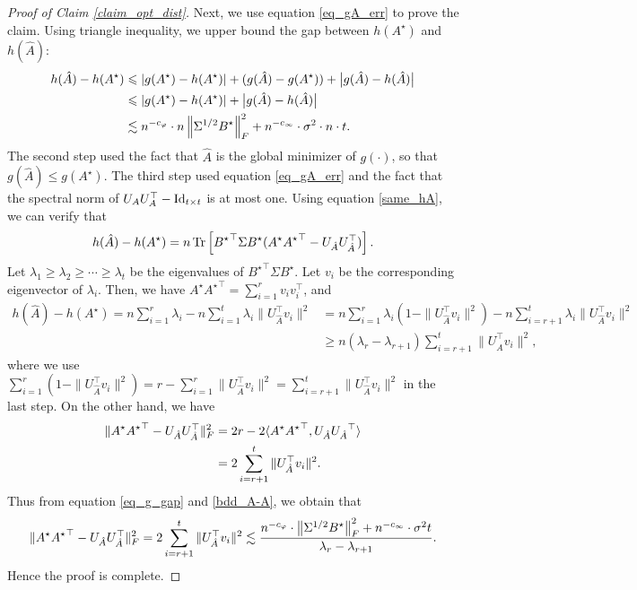 \begin{proof}[Proof of Claim \ref{claim_opt_dist}]
	\medskip
	Next, we use equation \eqref{eq_gA_err} to prove the claim.
	Using triangle inequality, we upper bound the gap between $h(A^{\star})$ and $h(\hat{A})$:  
	\begin{align}
		h(\hat{A})- h(A^{\star})   &\leqslant {\left| {g(A^{\star}) - h(A^{\star})} \right|} + (g(\hat A) - g({A}^{\star})) + \big|g(\hat{A}) - h(\hat{A})\big| \nonumber \\
		&\leqslant {\left| {g(A^{\star}) - h(A^{\star})} \right|}  + \big|g(\hat{A}) - h(\hat{A})\big|\nonumber \\
		&\lesssim n^{-c_\varphi}\cdot n \left\| \Sigma^{1/2} B^{\star} \right\|_{F}^2 + n^{-c_\infty}\cdot \sigma^2 \cdot n \cdot t. \label{eq_g_gap}
	\end{align}
	The second step used the fact that $\hat A$ is the global minimizer of $g(\cdot)$, so that $g(\hat A) \le g({A}^\star)$.
	The third step used equation \eqref{eq_gA_err} and the fact that the spectral norm of $U_A U_A^{\top} - \operatorname{Id}_{t\times t}$ is at most one. 
	Using equation \eqref{same_hA}, we can verify that
	$$h(\hat A)-h(A^\star) = n \operatorname{Tr}\left[{B^\star}^\top\Sigma B^\star ( A^\star {A^\star}^\top -U_{\hat A}U^\top_{\hat A})\right] .$$
	Let $\lambda_1\ge\lambda_2 \ge \cdots\ge \lambda_t$ be the eigenvalues of ${B^\star}^\top\Sigma B^\star$.
	Let $v_i$ be the corresponding eigenvector of $\lambda_i$.
	Then, we have $A^\star {A^\star}^\top =\sum_{i=1}^r v_i v_i^\top$, and
	\begin{align}
	h(\hat A)-h(A^\star) = n \sum_{i=1}^r \lambda_i - n\sum_{i=1}^t \lambda_i \| U^\top_{\hat A} v_i\|^2 &= n\sum_{i=1}^r \lambda_i\left(1 -  \| U^\top_{\hat A} v_i\|^2\right)-n\sum_{i=r+1}^t \lambda_i \| U^\top_{\hat A} v_i\|^2 \nonumber\\
	&\ge  n(\lambda_r-\lambda_{r+1}) \sum_{i=r+1}^t \| U^\top_{\hat A} v_i\|^2 , \label{bdd_A-A}
	\end{align}
	where we use $\sum_{i=1}^r \left(1 -  \| U^\top_{\hat A} v_i\|^2\right) = r- \sum_{i=1}^r  \| U^\top_{\hat A} v_i\|^2 =\sum_{i=r+1}^t \| U^\top_{\hat A} v_i\|^2  $ in the last step.
	On the other hand, we have
	\begin{align*}
	\| A^\star {A^\star}^\top -U_{\hat A}U^\top_{\hat A}\|_F^2
	&= 2r - 2\langle A^{\star}{A^{\star}}^{\top}, U_{\hat{A}} {U_{\hat{A}}}^{\top} \rangle \\
	&= 2 \sum_{i=r+1}^t \| U^\top_{\hat A} v_i\|^2.
	\end{align*}
	Thus from equation \eqref{eq_g_gap} and  \eqref{bdd_A-A}, we obtain that
	$$\| A^\star {A^\star}^\top -U_{\hat A}U^\top_{\hat A}\|_F^2  =2 \sum_{i=r+1}^t \| U^\top_{\hat A} v_i\|^2 \lesssim \frac{n^{-c_\varphi}\cdot  \left\| \Sigma^{1/2} B^{\star} \right\|_{F}^2 + n^{-c_\infty}\cdot \sigma^2 t}{\lambda_r- \lambda_{r+1}}  .$$
	Hence the proof is complete.
	\end{proof}
	
